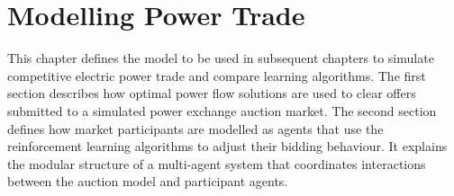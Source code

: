 \chapter{Modelling Power Trade}
\label{ch:method}
This chapter defines the model to be used in subsequent chapters to simulate
competitive electric power trade and compare learning algorithms. The first
section describes how optimal power flow solutions are used to clear offers
submitted to a simulated power exchange auction market. The second section
defines how market participants are modelled as agents that use the
reinforcement learning algorithms to adjust their bidding behaviour. It explains
the modular structure of a multi-agent system that coordinates interactions
between the auction model and participant agents.

%
%
